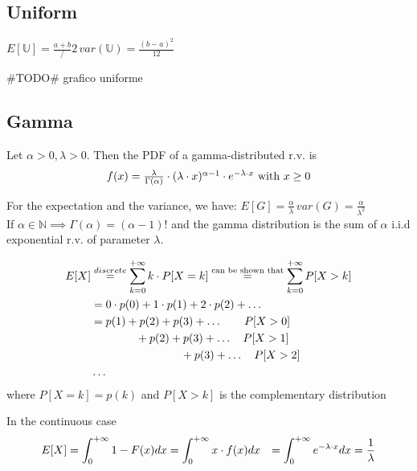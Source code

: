 \subsection{Uniform}
$E[\mathbb{U}]=\frac{a+b}/2 \, var(\mathbb{U})=\frac{(b-a)^2}{12}$

\#TODO\# grafico uniforme

\subsection{Gamma}
Let $\alpha >0 , \lambda >0$. Then the PDF of a gamma-distributed r.v. is
\begin{equation}
  $$f(x) = \frac{\lambda}{\Gamma(\alpha)}\cdot (\lambda \cdot x)^{\alpha -1} \cdot e^{-\lambda \cdot x} \text{ with } x\ge 0$$
\end{equation}

For the expectation and the variance, we have: $E[G]=\frac{\alpha}{\lambda} \, var(G)=\frac{\alpha}{\lambda^2}$
\\ If $\alpha \in \mathbb{N} \implies \Gamma(\alpha) = (\alpha-1)!$ and the gamma
distribution is the sum of $\alpha$ i.i.d exponential r.v. of parameter $\lambda$.

\begin{equation} $$
  \begin{split}
  E[X]&\stackrel{discrete}{=} \sum\limits_{k=0}^{+\infty} k \cdot P[X=k]
  \stackrel{\text{can be shown  that}}{=} \sum\limits_{k=0}^{+\infty} P[X>k]\\
  &=0 \cdot p(0) + 1 \cdot p(1) + 2 \cdot p(2) + \dots \\
  &= p(1) + p(2) + p(3)+ \dots \qquad P[X>0]\\
  & \qquad \qquad + p(2) + p(3) +\dots \quad P[X>1]\\
  & \qquad \qquad \qquad \qquad + p(3)+ \dots \quad P[X>2] \\
  & \dots
  \end{split}$$
\end{equation}
where $P[X=k]=p(k)$ and $P[X>k]$ is the complementary distribution

In the continuous case
\begin{equation}$$
  \begin{split}
    E[X] &= \int_{0}^{+\infty} 1-F(x) dx = \int_{0}^{+\infty} x \cdot f(x) dx
    &=\int_{0}^{+\infty} e^{-\lambda \cdot x} dx = \frac{1}{\lambda}
  \end{split}$$
\end{equation}
